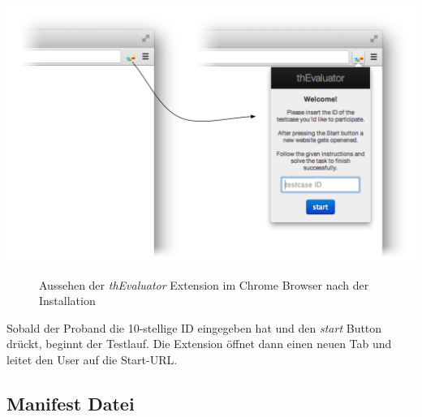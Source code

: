 \begin{center}
\includegraphics[scale=0.55]{./images/extension}
\end{center}
\begin{figure}[htb]
   \centering
   \caption{Aussehen der \textit{thEvaluator} Extension im Chrome Browser nach der\\Installation}
    \label{extension}
\end{figure}

Sobald der Proband die 10-stellige ID eingegeben hat und den \textit{start} Button drückt, beginnt der Testlauf. Die Extension öffnet dann einen neuen Tab und leitet den User auf die Start-URL.

\subsection{Manifest Datei}

